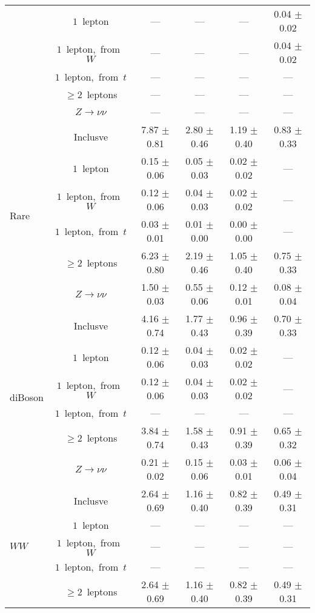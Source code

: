\documentclass{article}
\begin{document}
\begin{longtable}{|l|c|c|c|c|c|}
 & $1$~lepton  & ---  & ---  & ---  & 0.04 $\pm$ 0.02 \\* 
 & $1$~lepton,~from~$W$  & ---  & ---  & ---  & 0.04 $\pm$ 0.02 \\* 
 & $1$~lepton,~from~$t$  & ---  & ---  & ---  & --- \\* 
 & $\ge2$~leptons  & ---  & ---  & ---  & --- \\* 
 & $Z\rightarrow\nu\nu$  & ---  & ---  & ---  & --- \\* 
\hline 
\multirow{6}{*}{Rare} & Inclusve  & 7.87 $\pm$ 0.81  & 2.80 $\pm$ 0.46  & 1.19 $\pm$ 0.40  & 0.83 $\pm$ 0.33 \\* 
 & $1$~lepton  & 0.15 $\pm$ 0.06  & 0.05 $\pm$ 0.03  & 0.02 $\pm$ 0.02  & --- \\* 
 & $1$~lepton,~from~$W$  & 0.12 $\pm$ 0.06  & 0.04 $\pm$ 0.03  & 0.02 $\pm$ 0.02  & --- \\* 
 & $1$~lepton,~from~$t$  & 0.03 $\pm$ 0.01  & 0.01 $\pm$ 0.00  & 0.00 $\pm$ 0.00  & --- \\* 
 & $\ge2$~leptons  & 6.23 $\pm$ 0.80  & 2.19 $\pm$ 0.46  & 1.05 $\pm$ 0.40  & 0.75 $\pm$ 0.33 \\* 
 & $Z\rightarrow\nu\nu$  & 1.50 $\pm$ 0.03  & 0.55 $\pm$ 0.06  & 0.12 $\pm$ 0.01  & 0.08 $\pm$ 0.04 \\* 
\hline 
\multirow{6}{*}{diBoson} & Inclusve  & 4.16 $\pm$ 0.74  & 1.77 $\pm$ 0.43  & 0.96 $\pm$ 0.39  & 0.70 $\pm$ 0.33 \\* 
 & $1$~lepton  & 0.12 $\pm$ 0.06  & 0.04 $\pm$ 0.03  & 0.02 $\pm$ 0.02  & --- \\* 
 & $1$~lepton,~from~$W$  & 0.12 $\pm$ 0.06  & 0.04 $\pm$ 0.03  & 0.02 $\pm$ 0.02  & --- \\* 
 & $1$~lepton,~from~$t$  & ---  & ---  & ---  & --- \\* 
 & $\ge2$~leptons  & 3.84 $\pm$ 0.74  & 1.58 $\pm$ 0.43  & 0.91 $\pm$ 0.39  & 0.65 $\pm$ 0.32 \\* 
 & $Z\rightarrow\nu\nu$  & 0.21 $\pm$ 0.02  & 0.15 $\pm$ 0.06  & 0.03 $\pm$ 0.01  & 0.06 $\pm$ 0.04 \\* 
\hline 
\multirow{6}{*}{$WW$} & Inclusve  & 2.64 $\pm$ 0.69  & 1.16 $\pm$ 0.40  & 0.82 $\pm$ 0.39  & 0.49 $\pm$ 0.31 \\* 
 & $1$~lepton  & ---  & ---  & ---  & --- \\* 
 & $1$~lepton,~from~$W$  & ---  & ---  & ---  & --- \\* 
 & $1$~lepton,~from~$t$  & ---  & ---  & ---  & --- \\* 
 & $\ge2$~leptons  & 2.64 $\pm$ 0.69  & 1.16 $\pm$ 0.40  & 0.82 $\pm$ 0.39  & 0.49 $\pm$ 0.31 \\* 

\end{longtable}
\end{document}
